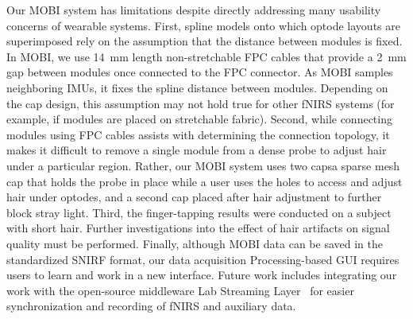 Our \ac{MOBI} system has limitations despite directly addressing many usability concerns of wearable systems. First, spline models onto which optode layouts are superimposed rely on the assumption that the distance between modules is fixed. In \ac{MOBI}, we use 14~mm length non-stretchable \ac{FPC} cables that provide a 2~mm gap between modules once connected to the \ac{FPC} connector. As \ac{MOBI} samples neighboring \ac{IMU}s, it fixes the spline distance between modules. Depending on the cap design, this assumption may not hold true for other \ac{fNIRS} systems (for example, if modules are placed on stretchable fabric). Second, while connecting modules using \ac{FPC} cables assists with determining the connection topology, it makes it difficult to remove a single module from a dense probe to adjust hair under a particular region. Rather, our \ac{MOBI} system uses two caps\textemdash a sparse mesh cap that holds the probe in place while a user uses the holes to access and adjust hair under optodes, and a second cap placed after hair adjustment to further block stray light. Third, the finger-tapping results were conducted on a subject with short hair. Further investigations into the effect of hair artifacts on signal quality must be performed. Finally, although \ac{MOBI} data can be saved in the standardized \ac{SNIRF} format, our data acquisition Processing-based \ac{GUI} requires users to learn and work in a new interface. Future work includes integrating our work with the open-source middleware Lab Streaming Layer~\cite{LSL2014} for easier synchronization and recording of \ac{fNIRS} and auxiliary data. 


